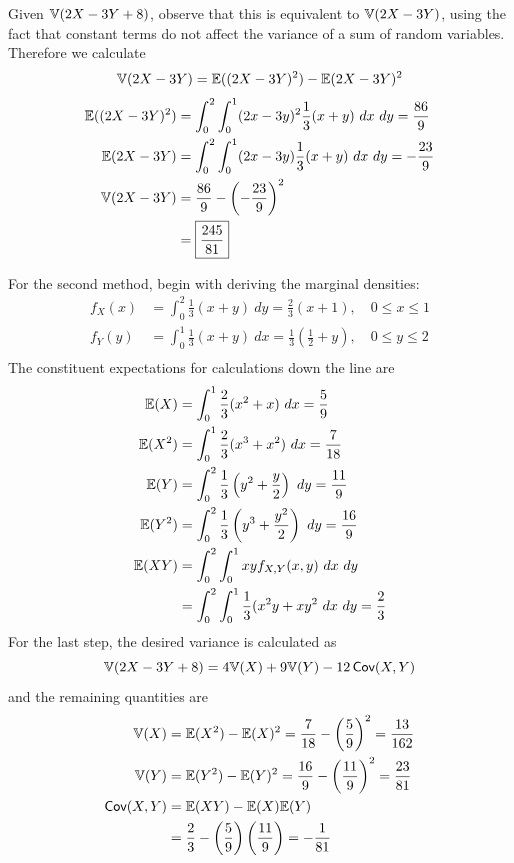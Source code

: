 \documentclass[a4paper]{article}
\begin{document}
Given \(\mathbb{V}(2X - 3Y + 8)\), observe that this is equivalent to \(\mathbb{V}(2X - 3Y)\), using the fact that constant terms do not affect the variance of a sum of random variables. Therefore we calculate
\[
	\mathbb{V}(2X - 3Y) = \mathbb{E}((2X-3Y)^{2}) - \mathbb{E}(2X-3Y)^{2}
\]
\begin{align*}
	\mathbb{E}((2X-3Y)^{2}) & = \int^{2}_{0} \int^{1}_{0} (2x-3y)^{2} \frac{1}{3} (x+y) \ dx  \ dy = \frac{86}{9}  \\
	\mathbb{E}(2X-3Y) & = \int^{2}_{0} \int^{1}_{0} (2x-3y) \frac{1}{3}(x + y) \ dx  \ dy = -\frac{23}{9} \\ 
	\mathbb{V}(2X-3Y) & = \frac{86}{9} - \left( -\frac{23}{9} \right)^{2} \\
		    & = \boxed{\frac{245}{81}}
\end{align*}

For the second method, begin with deriving the marginal densities:
\begin{align*}
	f_{X}(x) & = \int^{2}_{0} \frac{1}{3}(x + y) \ dy = \frac{2}{3}(x+1), \quad 0 \le x \le 1 \\
	f_{Y}(y) & = \int^{1}_{0} \frac{1}{3}(x + y) \ dx = \frac{1}{3} \left( \frac{1}{2} + y \right), \quad 0 \le y \le 2  \\ 
\end{align*}
The constituent expectations for calculations down the line are
\begin{align*}
	\E(X) & = \int^{1}_{0} \frac{2}{3}(x^{2} + x) \ dx = \frac{5}{9}  \\
	\E(X^{2}) & = \int^{1}_{0} \frac{2}{3}(x^{3} + x^{2}) \ dx = \frac{7}{18} \\ 
	\E(Y) & = \int^{2}_{0} \frac{1}{3}\left( y^{2} + \frac{y}{2} \right)  \ dy = \frac{11}{9} \\
	\E(Y^{2}) & = \int^{2}_{0} \frac{1}{3} \left( y^{3} + \frac{y^{2}}{2} \right)  \ dy = \frac{16}{9} \\
	\E(XY) & = \int^{2}_{0} \int^{1}_{0} xy f_{X,Y}(x,y) \ dx  \ dy\\
	       & = \int^{2}_{0} \int^{1}_{0} \frac{1}{3} (x^{2}y + xy^{2} \ dx  \ dy = \frac{2}{3} \\ 
\end{align*}
For the last step, the desired variance is calculated as
\[
	\mathbb{V}(2X - 3Y + 8) = 4 \mathbb{V}(X) + 9 \mathbb{V}(Y) - 12 \operatorname{\textsf{Cov}}(X,Y)
\]
and the remaining quantities are
\begin{align*}
	\mathbb{V}(X) & = \mathbb{E}(X^{2}) - \mathbb{E}(X)^{2} = \frac{7}{18} - \left( \frac{5}{9} \right)^{2} = \frac{13}{162} \\
	\mathbb{V}(Y) & = \mathbb{E}(Y^{2}) - \mathbb{E}(Y)^{2} = \frac{16}{9} - \left( \frac{11}{9} \right)^{2} = \frac{23}{81} \\ 
	\operatorname{\textsf{Cov}}(X,Y) & = \mathbb{E}(XY) - \mathbb{E}(X)\mathbb{E}(Y) \\
		  & = \frac{2}{3} - \left( \frac{5}{9} \right) \left( \frac{11}{9} \right) = -\frac{1}{81}
\end{align*}
\end{document}
